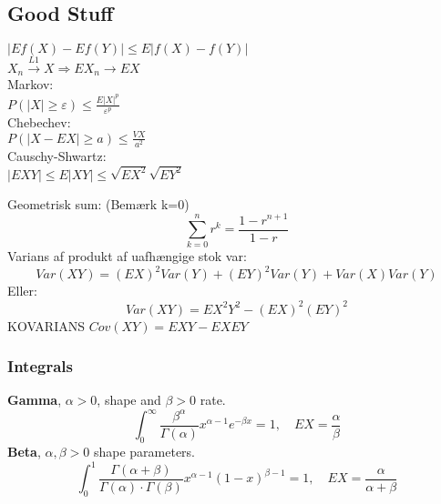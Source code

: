 




\subsection*{Good Stuff}
$|Ef(X) - Ef(Y)| \leq E|f(X)-f(Y)|$ \\
$X_n \xrightarrow{L1} X \Rightarrow EX_n \to EX$\\
Markov: \\
$ P(|X| \geq \varepsilon) \leq \frac{E|X|^p}{\varepsilon ^p}$ \\
Chebechev:\\
$P(|X-EX|\geq a) \leq \frac{VX}{a^2}$\\
Causchy-Shwartz:\\
$|EXY| \leq E|XY|  \leq \sqrt{EX^2}\sqrt{EY^2}$ 

Geometrisk sum: (Bemærk k=0)\\
$$ \sum\limits_{k=0}^n r^k =\frac{1-r^{n+1}}{1-r} $$
Varians af produkt af uafhængige stok var:
$$Var(XY) = (EX)^2Var(Y) + (EY)^2Var(Y) + Var(X)Var(Y)$$
Eller: 
$$Var(XY)=EX^2Y^2-(EX)^2(EY)^2 $$
KOVARIANS
$Cov(XY)=EXY-EXEY$
\subsubsection*{Integrals}
\textbf{Gamma}, $\alpha > 0$, shape and $\beta >0$ rate.
$$ \int_0^{\infty} \frac{\beta^{\alpha}}{\Gamma (\alpha)} x^{\alpha -1} e^{-\beta x} = 1  , \quad EX = \frac{\alpha}{\beta} $$
\textbf{Beta}, $\alpha , \beta  > 0$ shape parameters.
$$ \int_0^1 \frac{\Gamma (\alpha + \beta)}{\Gamma(\alpha) \cdot \Gamma(\beta)} x^{\alpha-1} (1-x)^{\beta -1} = 1 , \quad EX = \frac{\alpha}{\alpha + \beta}$$

